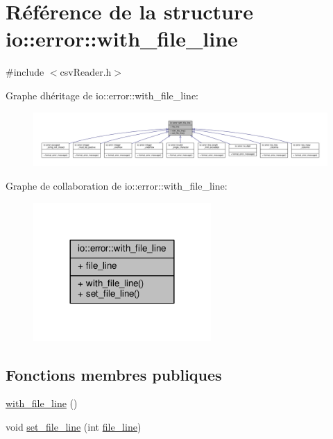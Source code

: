 \hypertarget{structio_1_1error_1_1with__file__line}{}\section{Référence de la structure io\+:\+:error\+:\+:with\+\_\+file\+\_\+line}
\label{structio_1_1error_1_1with__file__line}


{\ttfamily \#include $<$csv\+Reader.\+h$>$}



Graphe d\textquotesingle{}héritage de io\+:\+:error\+:\+:with\+\_\+file\+\_\+line\+:
\nopagebreak
\begin{figure}[H]
\begin{center}
\leavevmode
\includegraphics[width=350pt]{structio_1_1error_1_1with__file__line__inherit__graph}
\end{center}
\end{figure}


Graphe de collaboration de io\+:\+:error\+:\+:with\+\_\+file\+\_\+line\+:
\nopagebreak
\begin{figure}[H]
\begin{center}
\leavevmode
\includegraphics[width=192pt]{structio_1_1error_1_1with__file__line__coll__graph}
\end{center}
\end{figure}
\subsection*{Fonctions membres publiques}
\begin{DoxyCompactItemize}
\item 
\hyperlink{structio_1_1error_1_1with__file__line_a742ad5e6a169a7972c908f606a28ab4e}{with\+\_\+file\+\_\+line} ()
\item 
void \hyperlink{structio_1_1error_1_1with__file__line_aa92778a81778abc676ec6ee9952bba8c}{set\+\_\+file\+\_\+line} (int \hyperlink{structio_1_1error_1_1with__file__line_a391298c37172bcdb83aeb3daf65d5a0e}{file\+\_\+line})
\end{DoxyCompactItemize}
